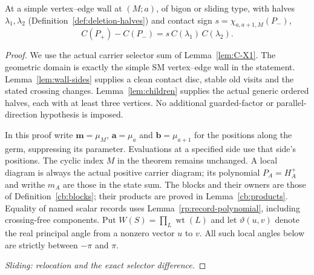 \begin{theorem}\label{thm:C-S7}\leanok
At a simple vertex--edge wall at $(M;a)$, of bigon or sliding type, with
halves $\lambda_1,\lambda_2$ (Definition~\ref{def:deletion-halves}) and
contact sign $s=\chi_{a,a+1,M}(P_-)$,
\[
C(P_+)-C(P_-)=s\,C(\lambda_1)\,C(\lambda_2).
\]

\end{theorem}
\begin{proof}\leanok{}
We use the actual carrier selector sum of Lemma~\ref{lem:C-X1}.
The geometric domain is exactly the simple SM vertex--edge wall in the
statement. Lemma~\ref{lem:wall-sides} supplies a clean contact disc,
stable old visits and the stated crossing changes. Lemma~\ref{lem:children}
supplies the actual generic ordered halves, each with at least three
vertices. No additional guarded-factor or parallel-direction hypothesis
is imposed.

In this proof write $\mathbf m=\mu_M$, $\mathbf a=\mu_a$ and
$\mathbf b=\mu_{a+1}$ for the positions along the germ, suppressing its parameter. Evaluations
at a specified side use that side's positions. The cyclic index $M$
in the theorem remains unchanged. A local diagram is always the actual
positive carrier diagram; its polynomial $P_A=H_A^+$ and writhe $m_A$
are those in the state sum. The blocks and their owners are those of
Definition~\ref{cb:blocks}; their products are proved in
Lemma~\ref{cb:products}. Equality of named scalar records uses
Lemma~\ref{rp:record-polynomial}, including crossing-free components.
Put $W(S)=\prod_L\operatorname{wt}(L)$ and let $\vartheta(u,v)$
denote the real principal angle from a nonzero vector $u$ to $v$.
All such local angles below are strictly between $-\pi$ and $\pi$.

\par\medskip\noindent\emph{Sliding: relocation and the exact selector difference.}\par


\end{proof}
